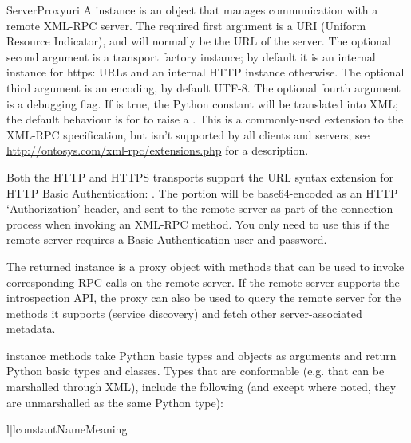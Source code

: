 \begin{classdesc}{ServerProxy}{uri}
A  instance is an object that manages communication
with a remote XML-RPC server.  The required first argument is a URI
(Uniform Resource Indicator), and will normally be the URL of the
server.  The optional second argument is a transport factory instance;
by default it is an internal  instance for https:
URLs and an internal HTTP  instance otherwise.  The
optional third argument is an encoding, by default UTF-8. The optional
fourth argument is a debugging flag.  If  is true, 
the Python constant  will be translated into XML; the
default behaviour is for  to raise a .
This is a commonly-used extension to the XML-RPC specification, but isn't
supported by all clients and servers; see
\url{http://ontosys.com/xml-rpc/extensions.php} for a description. 

Both the HTTP and HTTPS transports support the URL syntax extension for
HTTP Basic Authentication: .  The 
 portion will be base64-encoded as an HTTP `Authorization'
header, and sent to the remote server as part of the connection process
when invoking an XML-RPC method.  You only need to use this if the
remote server requires a Basic Authentication user and password.

The returned instance is a proxy object with methods that can be used
to invoke corresponding RPC calls on the remote server.  If the remote
server supports the introspection API, the proxy can also be used to query
the remote server for the methods it supports (service discovery) and
fetch other server-associated metadata.

 instance methods take Python basic types and objects as 
arguments and return Python basic types and classes.  Types that are
conformable (e.g. that can be marshalled through XML), include the
following (and except where noted, they are unmarshalled as the same
Python type):

\begin{tableii}{l|l}{constant}{Name}{Meaning}
\end{tableii}


\end{classdesc}
